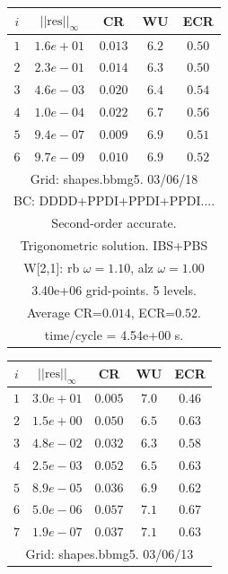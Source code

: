 \begin{table}[hbt]
\begin{center}
{\begin{tabular}{|c|c|c|c|c|}
\hline 
\end{tabular}
\begin{tabular}{|c|c|c|c|c|} \hline 
 $i$   & $\vert\vert\mbox{res}\vert\vert_\infty$  &  CR     &  WU    & ECR  \\   \hline 
 $ 1$  & $ 1.6e+01$ & $0.013$ & $ 6.2$ & $0.50$ \\ 
 $ 2$  & $ 2.3e-01$ & $0.014$ & $ 6.3$ & $0.50$ \\ 
 $ 3$  & $ 4.6e-03$ & $0.020$ & $ 6.4$ & $0.54$ \\ 
 $ 4$  & $ 1.0e-04$ & $0.022$ & $ 6.7$ & $0.56$ \\ 
 $ 5$  & $ 9.4e-07$ & $0.009$ & $ 6.9$ & $0.51$ \\ 
 $ 6$  & $ 9.7e-09$ & $0.010$ & $ 6.9$ & $0.52$ \\ 
\hline 
\multicolumn{5}{|c|}{Grid: shapes.bbmg5. 03/06/18}  \\
\multicolumn{5}{|c|}{BC: DDDD+PPDI+PPDI+PPDI....}  \\
\multicolumn{5}{|c|}{Second-order accurate.}  \\
\multicolumn{5}{|c|}{Trigonometric solution. IBS+PBS}  \\
\multicolumn{5}{|c|}{W[2,1]: rb $\omega=1.10$, alz $\omega=1.00$}  \\
\multicolumn{5}{|c|}{3.40e+06 grid-points. 5 levels.}  \\
\multicolumn{5}{|c|}{Average CR=$0.014$, ECR=$0.52$.}  \\
\multicolumn{5}{|c|}{time/cycle = 4.54e+00 s.}  \\
\hline 
\end{tabular}
\begin{tabular}{|c|c|c|c|c|} \hline 
 $i$   & $\vert\vert\mbox{res}\vert\vert_\infty$  &  CR     &  WU    & ECR  \\   \hline 
 $ 1$  & $ 3.0e+01$ & $0.005$ & $ 7.0$ & $0.46$ \\ 
 $ 2$  & $ 1.5e+00$ & $0.050$ & $ 6.5$ & $0.63$ \\ 
 $ 3$  & $ 4.8e-02$ & $0.032$ & $ 6.3$ & $0.58$ \\ 
 $ 4$  & $ 2.5e-03$ & $0.052$ & $ 6.5$ & $0.63$ \\ 
 $ 5$  & $ 8.9e-05$ & $0.036$ & $ 6.9$ & $0.62$ \\ 
 $ 6$  & $ 5.0e-06$ & $0.057$ & $ 7.1$ & $0.67$ \\ 
 $ 7$  & $ 1.9e-07$ & $0.037$ & $ 7.1$ & $0.63$ \\ 
\hline 
\multicolumn{5}{|c|}{Grid: shapes.bbmg5. 03/06/13}  \\

\end{tabular}}
\end{center}
\end{table}
